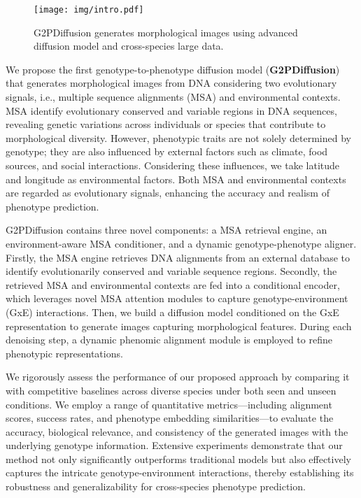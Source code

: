 \vspace{-3mm}
\begin{figure}[h]
    \centering
    \texttt{[image: img/intro.pdf]}
    \vspace{-6mm}
    \caption{G2PDiffusion generates morphological images using advanced diffusion model and cross-species large data.}
    \label{fig:cover_idea}
\end{figure}
\vspace{-3mm}



We propose the first genotype-to-phenotype diffusion model (\textbf{G2PDiffusion}) that generates morphological images from DNA considering two evolutionary signals, i.e., multiple sequence alignments (MSA) and environmental contexts. MSA identify evolutionary conserved and variable regions in DNA sequences, revealing genetic variations across individuals or species that contribute to morphological diversity. However, phenotypic traits are not solely determined by genotype; they are also influenced by external factors such as climate, food sources, and social interactions. Considering these influences, we take latitude and longitude as environmental factors. Both MSA and environmental contexts are regarded as evolutionary signals, enhancing the accuracy and realism of phenotype prediction.



G2PDiffusion contains three novel components: a MSA retrieval engine, an environment-aware MSA conditioner, and a dynamic genotype-phenotype aligner. Firstly, the MSA engine retrieves DNA alignments from an external database to identify evolutionarily conserved and variable sequence regions. Secondly, the retrieved MSA and environmental contexts are fed into a conditional encoder, which leverages novel MSA attention modules to capture genotype-environment (GxE) interactions. Then, we build a diffusion model conditioned on the GxE representation to generate images capturing morphological features. During each denoising step, a dynamic phenomic alignment module is employed to refine phenotypic representations.


We rigorously assess the performance of our proposed approach by comparing it with competitive baselines across diverse species under both seen and unseen conditions. We employ a range of quantitative metrics—including alignment scores, success rates, and phenotype embedding similarities—to evaluate the accuracy, biological relevance, and consistency of the generated images with the underlying genotype information. Extensive experiments demonstrate that our method not only significantly outperforms traditional models but also effectively captures the intricate genotype-environment interactions, thereby establishing its robustness and generalizability for cross-species phenotype prediction.



